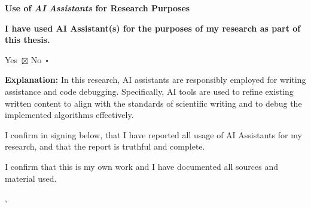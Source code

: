\thispagestyle{empty}

\vspace*{0.30\textheight}

\noindent
{\Large\textbf{Use of \textit{AI Assistants} for Research Purposes}}

\bigskip
\noindent
\textbf{I have used AI Assistant(s) for the purposes of my research as part of this thesis.}

\medskip
\noindent
Yes\, $\boxtimes$ \hspace{2em} No\, $\square$

\bigskip
\noindent
\textbf{Explanation:} In this research, AI assistants are responsibly employed
for writing assistance and code debugging. Specifically, AI tools are used to
refine existing written content to align with the standards of scientific
writing and to debug the implemented algorithms effectively.

\vspace{10mm}

\noindent
I confirm in signing below, that I have reported all usage of AI Assistants for
my research, and that the report is truthful and complete.

\vspace{15mm}

\noindent
I confirm that this \MakeLowercase{\getDoctype{}} is my own work and I have
documented all sources and material used.

\vspace{15mm}

\noindent
\getSubmissionLocation{}, \getSubmissionDate{} \hspace{50mm} \getAuthor{}

\cleardoublepage{}
